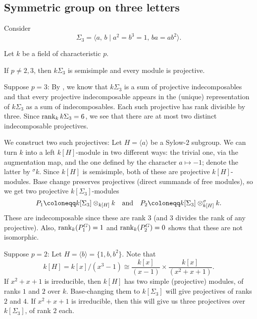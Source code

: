 \documentclass[12pt]{article}
\begin{document}
\subsection{Symmetric group on three letters}

Consider 
\begin{equation*} 
	\Sigma_{3} = \langle a,\, b \mid a^{2} = b^{3} = 1,\, ba = ab^{2} \rangle.
\end{equation*}

Let $k$ be a field of characteristic $p$.

If $p \neq 2, 3$, then $k\Sigma_{3}$ is semisimple and every module is projective.

Suppose $p = 3$: By , we know that $k\Sigma_{3}$ is a sum of projective indecomposables and 
that every projective indecomposable appears in the (unique) representation of $k\Sigma_{3}$ as a sum of indecomposables. 
Each such projective has rank divisible by three. 
Since $\operatorname{rank}_{k} k\Sigma_{3} = 6$, we see that there are at most two distinct indecomposable projectives.

We construct two such projectives: Let $H = \langle a \rangle$ be a Sylow-$2$ subgroup. We can turn $k$ into a left $k[H]$-module in two different ways: 
the trivial one, via the augmentation map, 
and the one defined by the character $a \mapsto -1$; 
denote the latter by $^{\sigma}k$. \newline
Since $k[H]$ is semisimple, both of these are projective $k[H]$-modules. 
Base change preserves projectives (direct summands of free modules), so we get two projective $k[\Sigma_{3}]$-modules
\begin{equation*} 
	P_{1} \coloneqq k[\Sigma_{3}] \otimes_{k[H]} k \andd P_{2} \coloneqq k[\Sigma_{3}] \otimes_{k[H]} ^{\sigma}k.
\end{equation*}
These are indecomposable since these are rank $3$ (and $3$ divides the rank of any projective).
Also, $\operatorname{rank}_{k}(P_{1}^{G}) = 1$ and $\operatorname{rank}_{k}(P_{2}^{G}) = 0$ shows that these are not isomorphic.

Suppose $p = 2$: Let $H = \langle b \rangle = \{1, b, b^{2}\}$. 
Note that 
\begin{equation*} 
	k[H] = k[x]/(x^{3} - 1) \cong \frac{k[x]}{(x - 1)} \times \frac{k[x]}{(x^{2} + x + 1)}.
\end{equation*}
If $x^{2} + x + 1$ is irreducible, then $k[H]$ has two simple (projective) modules, of ranks $1$ and $2$ over $k$. 
Base-changing them to $k[\Sigma_{3}]$ will give projectives of ranks $2$ and $4$. \newline
If $x^{2} + x + 1$ is irreducible, then this will give us three projectives over $k[\Sigma_{3}]$, of rank $2$ each. 
\end{document}

